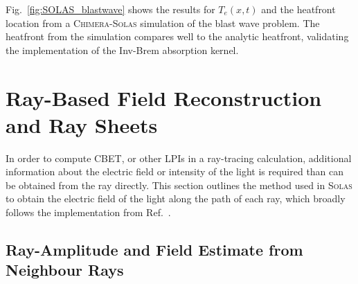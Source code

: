 Fig.~\ref{fig:SOLAS_blastwave} shows the results for $T_e(x,t)$ and the heatfront location from a \textsc{Chimera}-\textsc{Solas} simulation of the blast wave problem.
The heatfront from the simulation compares well to the analytic heatfront, validating the implementation of the \ac{Inv-Brem} absorption kernel.


\section{Ray-Based Field Reconstruction and Ray Sheets}%
\label{sec:SOLAS_field_reconstruc}

In order to compute \ac{CBET}, or other \ac{LPIs} in a ray-tracing calculation, additional information about the electric field or intensity of the light is required than can be obtained from the ray directly.
This section outlines the method used in \textsc{Solas} to obtain the electric field of the light along the path of each ray, which broadly follows the implementation from Ref.~\cite{follett_validation_2022}.

\subsection{Ray-Amplitude and Field Estimate from Neighbour Rays}%
\label{sec:SOLAS_ray_amplitude}

